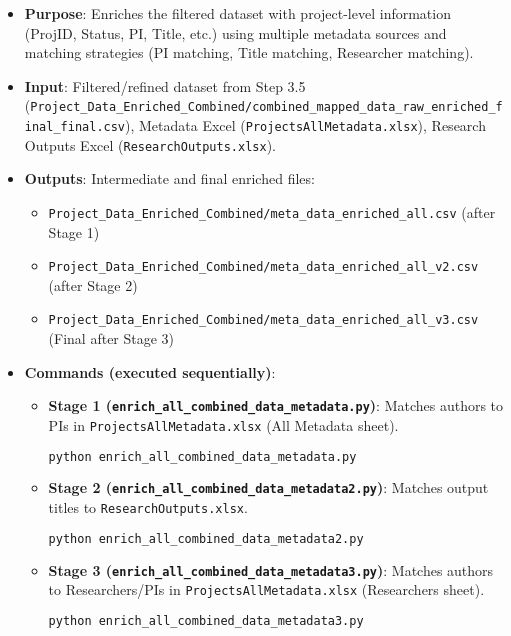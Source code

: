 \documentclass[12pt]{article}
\providecommand{\tightlist}{%
  \setlength{\itemsep}{0pt}\setlength{\parskip}{0pt}}
\begin{document}
\begin{itemize}
\tightlist
\item
  \textbf{Purpose}: Enriches the filtered dataset with project-level
  information (ProjID, Status, PI, Title, etc.) using multiple metadata
  sources and matching strategies (PI matching, Title matching,
  Researcher matching).
\item
  \textbf{Input}: Filtered/refined dataset from Step 3.5
  (\texttt{Project\_Data\_Enriched\_Combined/combined\_mapped\_data\_raw\_enriched\_final\_final.csv}),
  Metadata Excel (\texttt{ProjectsAllMetadata.xlsx}), Research Outputs
  Excel (\texttt{ResearchOutputs.xlsx}).
\item
  \textbf{Outputs}: Intermediate and final enriched files:

  \begin{itemize}
  \tightlist
  \item
    \texttt{Project\_Data\_Enriched\_Combined/meta\_data\_enriched\_all.csv}
    (after Stage 1)
  \item
    \texttt{Project\_Data\_Enriched\_Combined/meta\_data\_enriched\_all\_v2.csv}
    (after Stage 2)
  \item
    \texttt{Project\_Data\_Enriched\_Combined/meta\_data\_enriched\_all\_v3.csv}
    (Final after Stage 3)
  \end{itemize}
\item
  \textbf{Commands (executed sequentially)}:

  \begin{itemize}
  \item
    \textbf{Stage 1
    (\texttt{enrich\_all\_combined\_data\_metadata.py})}: Matches
    authors to PIs in \texttt{ProjectsAllMetadata.xlsx} (All Metadata
    sheet).

\begin{lstlisting}[language=Python]
python enrich_all_combined_data_metadata.py
\end{lstlisting}
  \item
    \textbf{Stage 2
    (\texttt{enrich\_all\_combined\_data\_metadata2.py})}: Matches
    output titles to \texttt{ResearchOutputs.xlsx}.

\begin{lstlisting}[language=Python]
python enrich_all_combined_data_metadata2.py
\end{lstlisting}
  \item
    \textbf{Stage 3
    (\texttt{enrich\_all\_combined\_data\_metadata3.py})}: Matches
    authors to Researchers/PIs in \texttt{ProjectsAllMetadata.xlsx}
    (Researchers sheet).

\begin{lstlisting}[language=Python]
python enrich_all_combined_data_metadata3.py
\end{lstlisting}
  \end{itemize}
\end{itemize}
\end{document}
